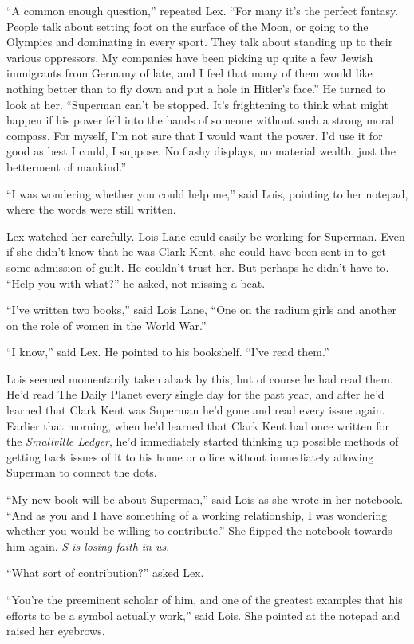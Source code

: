 \documentclass[ebook,12pt]{memoir}
\begin{document}
``A common enough question,'' repeated Lex. ``For many it's the perfect
fantasy. People talk about setting foot on the surface of the Moon, or
going to the Olympics and dominating in every sport. They talk about
standing up to their various oppressors. My companies have been picking
up quite a few Jewish immigrants from Germany of late, and I feel that
many of them would like nothing better than to fly down and put a hole
in Hitler's face.'' He turned to look at her. ``Superman can't be
stopped. It's frightening to think what might happen if his power fell
into the hands of someone without such a strong moral compass. For
myself, I'm not sure that I would want the power. I'd use it for good as
best I could, I suppose. No flashy displays, no material wealth, just
the betterment of mankind.''

``I was wondering whether you could help me,'' said Lois, pointing to
her notepad, where the words were still written.

Lex watched her carefully. Lois Lane could easily be working for
Superman. Even if she didn't know that he was Clark Kent, she could have
been sent in to get some admission of guilt. He couldn't trust her. But
perhaps he didn't have to. ``Help you with what?'' he asked, not missing
a beat.

``I've written two books,'' said Lois Lane, ``One on the radium girls
and another on the role of women in the World War.''

``I know,'' said Lex. He pointed to his bookshelf. ``I've read them.''

Lois seemed momentarily taken aback by this, but of course he had read
them. He'd read The Daily Planet every single day for the past year, and
after he'd learned that Clark Kent was Superman he'd gone and read every
issue again. Earlier that morning, when he'd learned that Clark Kent had
once written for the \emph{Smallville Ledger}, he'd immediately started
thinking up possible methods of getting back issues of it to his home or
office without immediately allowing Superman to connect the dots.

``My new book will be about Superman,'' said Lois as she wrote in her
notebook. ``And as you and I have something of a working relationship, I
was wondering whether you would be willing to contribute.'' She flipped
the notebook towards him again. \emph{S is losing faith in us}.

``What sort of contribution?'' asked Lex.

``You're the preeminent scholar of him, and one of the greatest examples
that his efforts to be a symbol actually work,'' said Lois. She pointed
at the notepad and raised her eyebrows.
\end{document}
